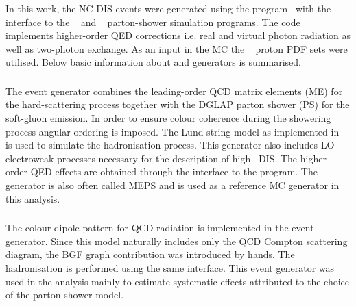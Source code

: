 In this work, the NC DIS events were generated using the \heracles program~\cite{cpc:69:155} with the \djangoh~\cite{cpc:81:381} interface to the \lepto~\cite{Ingelman:1996mq} and \ariadne~\cite{cpc:71:15,Lonnblad:1994wk} parton-shower simulation programs. The \djangoh code implements higher-order QED corrections i.e. real and virtual photon radiation as well as two-photon exchange. As an input in the MC the \cteqfived~\cite{pr:d51:4763} proton PDF sets were utilised. Below basic information about \lepto and \ariadne generators is summarised.

\subsubsection{\lepto}
The \lepto event generator combines the leading-order QCD matrix elements (ME) for the hard-scattering process together with the DGLAP parton shower (PS) for the soft-gluon emission. In order to ensure colour coherence during the showering process angular ordering is imposed. The Lund string model as implemented in \jetset~\cite{cpc:43:367} is used to simulate the hadronisation process. This generator also includes LO electroweak processes necessary for the description of high-\qsq~DIS. The higher-order QED effects are obtained through the interface to the \heracles program. The \lepto generator is also often called MEPS and is used as a reference MC generator in this analysis.
\subsubsection{\ariadne}
The colour-dipole pattern for QCD radiation is implemented in the \ariadne event generator. Since this model naturally includes only the QCD Compton scattering diagram, the BGF graph contribution was introduced by hands. The hadronisation is performed using the same \jetset interface. This event generator was used in the analysis mainly to estimate systematic effects attributed to the choice of the parton-shower model.
